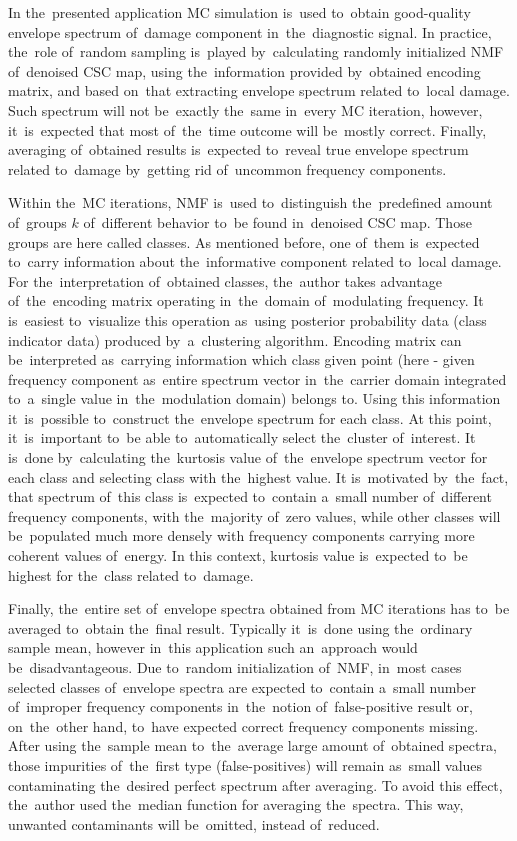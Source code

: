 In the~presented application MC simulation is~used to~obtain good-quality envelope spectrum of~damage component in~the~diagnostic signal. In practice, the~role of~random sampling is~played by~calculating randomly initialized NMF of~denoised CSC map, using the~information provided by~obtained encoding matrix, and based on~that extracting envelope spectrum related to~local damage. Such spectrum will not be~exactly the~same in~every MC iteration, however, it~is~expected that most of~the~time outcome will be~mostly correct. Finally, averaging of~obtained results is~expected to~reveal true envelope spectrum related to~damage by~getting rid of~uncommon frequency components.

Within the~MC iterations, NMF is~used to~distinguish the~predefined amount of~groups $k$ of~different behavior to~be found in~denoised CSC map. Those groups are here called classes. As mentioned before, one of~them is~expected to~carry information about the~informative component related to~local damage. For the~interpretation of~obtained classes, the~author takes advantage of~the~encoding matrix operating in~the~domain of~modulating frequency. It is~easiest to~visualize this operation as~using posterior probability data (class indicator data) produced by~a~clustering algorithm. Encoding matrix can be~interpreted as~carrying information which class given point (here - given frequency component as~entire spectrum vector in~the~carrier domain integrated to~a~single value in~the~modulation domain) belongs to. Using this information it~is~possible to~construct the~envelope spectrum for each class. At this point, it~is~important to~be able to~automatically select the~cluster of~interest. It is~done by~calculating the~kurtosis value of~the~envelope spectrum vector for each class and selecting class with the~highest value. It is~motivated by~the~fact, that spectrum of~this class is~expected to~contain a~small number of~different frequency components, with the~majority of~zero values, while other classes will be~populated much more densely with frequency components carrying more coherent values of~energy. In this context, kurtosis value is~expected to~be highest for the~class related to~damage.

Finally, the~entire set of~envelope spectra obtained from MC iterations has to~be averaged to~obtain the~final result. Typically it~is~done using the~ordinary sample mean, however in~this application such an~approach would be~disadvantageous. Due to~random initialization of~NMF, in~most cases selected classes of~envelope spectra are expected to~contain a~small number of~improper frequency components in~the~notion of~false-positive result or, on~the~other hand, to~have expected correct frequency components missing. After using the~sample mean to~the~average large amount of~obtained spectra, those impurities of~the~first type (false-positives) will remain as~small values contaminating the~desired perfect spectrum after averaging. To avoid this effect, the~author used the~median function for averaging the~spectra. This way, unwanted contaminants will be~omitted, instead of~reduced.

